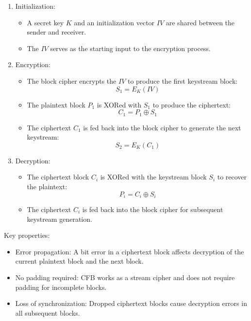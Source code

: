 \begin{enumerate}
    \item Initialization:
    \begin{itemize}
        \item A secret key \( K \) and an initialization vector \( IV \) are shared between the sender and receiver.
        \item The \( IV \) serves as the starting input to the encryption process.
    \end{itemize}

    \item Encryption:
    \begin{itemize}
        \item The block cipher encrypts the \( IV \) to produce the first keystream block:
        \[
        S_1 = E_K(IV)
        \]
        \item The plaintext block \( P_1 \) is XORed with \( S_1 \) to produce the ciphertext:
        \[
        C_1 = P_1 \oplus S_1
        \]
        \item The ciphertext \( C_1 \) is fed back into the block cipher to generate the next keystream:
        \[
        S_2 = E_K(C_1)
        \]
    \end{itemize}

    \item Decryption:
    \begin{itemize}
        \item The ciphertext block \( C_i \) is XORed with the keystream block \( S_i \) to recover the plaintext:
        \[
        P_i = C_i \oplus S_i
        \]
        \item The ciphertext \( C_i \) is fed back into the block cipher for subsequent keystream generation.
    \end{itemize}
\end{enumerate}

Key properties:
\begin{itemize}
    \item Error propagation: A bit error in a ciphertext block affects decryption of the current plaintext block and the next block.
    \item No padding required: CFB works as a stream cipher and does not require padding for incomplete blocks.
    \item Loss of synchronization: Dropped ciphertext blocks cause decryption errors in all subsequent blocks.
\end{itemize}

